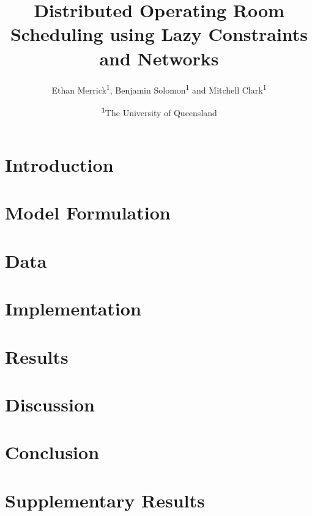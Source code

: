 \documentclass[
	a4paper, %
	10pt, %
	unnumberedsections, %
	twoside, %
]{LTJournalArticle}
\title{Distributed Operating Room Scheduling using Lazy Constraints and Networks} %
\author{%
	Ethan Merrick\textsuperscript{1}, Benjamin Solomon\textsuperscript{1} and Mitchell Clark\textsuperscript{1}
}
\date{\footnotesize\textsuperscript{\textbf{1}}The University of Queensland}
\begin{document}
	
	

	
	
		

	\maketitle

	\section{Introduction}
	

	\section{Model Formulation}
	 

	\section{Data}
	

	\section{Implementation}
	

	\section{Results}
	

	\section{Discussion}
	
	
	\section{Conclusion}
	

	\appendix
	\section{Supplementary Results}
	


	\printbibliography %
\end{document}
